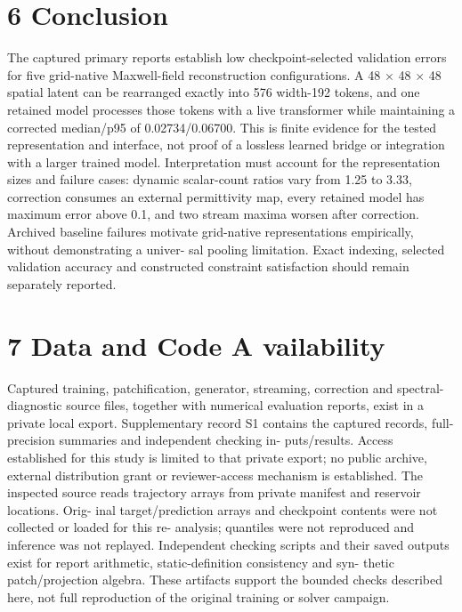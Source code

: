 \documentclass[11pt]{article}
\begin{document}
\section*{6 Conclusion}

The captured primary reports establish low checkpoint-selected validation errors for five grid-native
Maxwell-field reconstruction configurations. A 48 \ensuremath{\times} 48 \ensuremath{\times} 48 spatial latent can be rearranged exactly
into 576 width-192 tokens, and one retained model processes those tokens with a live transformer
while maintaining a corrected median/p95 of 0.02734/0.06700. This is finite evidence for the tested
representation and interface, not proof of a lossless learned bridge or integration with a larger
trained model.
Interpretation must account for the representation sizes and failure cases: dynamic scalar-count
ratios vary from 1.25 to 3.33, correction consumes an external permittivity map, every retained
model has maximum error above 0.1, and two stream maxima worsen after correction. Archived
baseline failures motivate grid-native representations empirically, without demonstrating a univer-
sal pooling limitation. Exact indexing, selected validation accuracy and constructed constraint
satisfaction should remain separately reported.

\section*{7 Data and Code A vailability}

Captured training, patchification, generator, streaming, correction and spectral-diagnostic source
files, together with numerical evaluation reports, exist in a private local export. Supplementary
record S1 contains the captured records, full-precision summaries and independent checking in-
puts/results. Access established for this study is limited to that private export; no public archive,
external distribution grant or reviewer-access mechanism is established.
The inspected source reads trajectory arrays from private manifest and reservoir locations. Orig-
inal target/prediction arrays and checkpoint contents were not collected or loaded for this re-
analysis; quantiles were not reproduced and inference was not replayed. Independent checking
scripts and their saved outputs exist for report arithmetic, static-definition consistency and syn-
thetic patch/projection algebra. These artifacts support the bounded checks described here, not
full reproduction of the original training or solver campaign.
\end{document}

